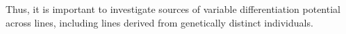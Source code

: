 Thus, it is important to investigate sources of variable differentiation potential across lines, including lines derived from genetically distinct individuals.











